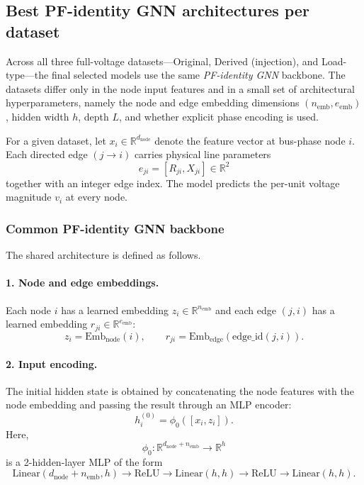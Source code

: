\documentclass[11pt]{article}
\begin{document}
\subsection{Best PF-identity GNN architectures per dataset}
\label{sec:best-arch-per-dataset}

Across all three full-voltage datasets---Original, Derived (injection), and Load-type---the final selected models use the same \emph{PF-identity GNN} backbone. The datasets differ only in the node input features and in a small set of architectural hyperparameters, namely the node and edge embedding dimensions $(n_{\text{emb}}, e_{\text{emb}})$, hidden width $h$, depth $L$, and whether explicit phase encoding is used.

For a given dataset, let $x_i \in \mathbb{R}^{d_{\text{node}}}$ denote the feature vector at bus-phase node $i$. Each directed edge $(j \to i)$ carries physical line parameters
\[
e_{ji} = [R_{ji}, X_{ji}] \in \mathbb{R}^2
\]
together with an integer edge index. The model predicts the per-unit voltage magnitude $v_i$ at every node.

\subsubsection*{Common PF-identity GNN backbone}

The shared architecture is defined as follows.

\paragraph{1. Node and edge embeddings.}
Each node $i$ has a learned embedding $z_i \in \mathbb{R}^{n_{\text{emb}}}$ and each edge $(j,i)$ has a learned embedding $r_{ji} \in \mathbb{R}^{e_{\text{emb}}}$:
\[
z_i = \mathrm{Emb}_{\mathrm{node}}(i), 
\qquad
r_{ji} = \mathrm{Emb}_{\mathrm{edge}}(\mathrm{edge\_id}(j,i)).
\]

\paragraph{2. Input encoding.}
The initial hidden state is obtained by concatenating the node features with the node embedding and passing the result through an MLP encoder:
\[
h_i^{(0)} = \phi_0([x_i, z_i]).
\]
Here,
\[
\phi_0 : \mathbb{R}^{d_{\text{node}} + n_{\text{emb}}} \to \mathbb{R}^{h}
\]
is a 2-hidden-layer MLP of the form
\[
\mathrm{Linear}(d_{\text{node}}+n_{\text{emb}},h)
\to \mathrm{ReLU}
\to \mathrm{Linear}(h,h)
\to \mathrm{ReLU}
\to \mathrm{Linear}(h,h).
\]
\end{document}
